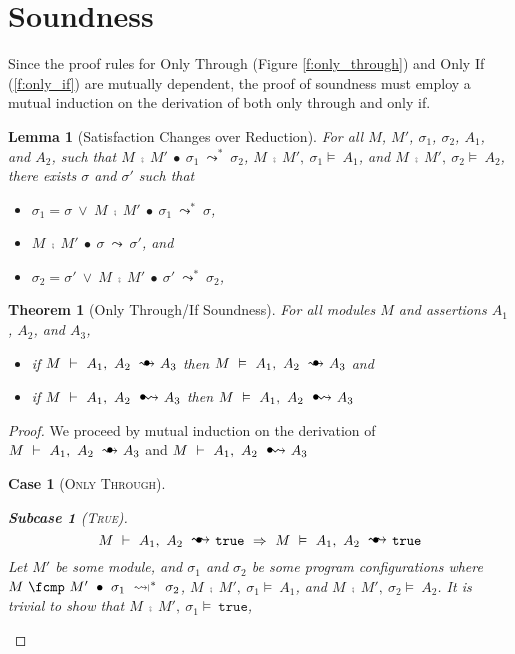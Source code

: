 \documentclass[12pt]{article}
\newcommand{\constrained}{\mathrel{\leadsto\ \!\!\!\!{\raisebox{1pt}{$\mathsmaller{\mathsmaller{\mathsmaller{\mathsmaller\rvert}}}$}}}}
\newcommand{\reduction}[4]{#1\ \fcmp\ #2\ \bullet\ #3\ \leadsto\ #4}
\newcommand{\reductions}[4]{#1\ \fcmp\ #2\ \bullet\ #3\ \leadsto^*\ #4}
\newcommand{\constrainedReductions}[4]{#1\ \fcmp\ #2\ \bullet\ #3\ \constrained^*\ #4}
\newcommand{\satisfies}[4]{#1\ \fcmp\ #2,\ #3 \vDash\ #4}
\newcommand\trans{\mathlarger{\mathlarger \leadsto}}
\newcommand\oi{\hspace{1mm}{\raisebox{1pt}{$\bullet$}}\hspace{-1mm}{\trans}}
\newcommand\ot{\hspace{2mm}{\raisebox{1pt}{$\bullet$}}\hspace{-3mm}{\trans}}
\newcommand\onlyIf[3]{#1,\ #2\ \oi\ #3}
\newcommand\onlyThrough[3]{#1,\ #2\ \ot\ #3}
\newtheorem{theorem}{Theorem}
\newtheorem{case}{Case}
\newtheorem{subcase}{Subcase}
\newtheorem{lemma}{Lemma}
\numberwithin{case}{lemma}
\numberwithin{case}{theorem}
\numberwithin{subcase}{case}
\begin{document}
\newpage
{\color{Green}
\section{Soundness}
Since the proof rules for Only Through (Figure \ref{f:only_through}) 
and Only If (\ref{f:only_if}) are mutually dependent, the proof of
soundness must employ a mutual induction on the derivation of both
only through and only if.
\begin{lemma}[Satisfaction Changes over Reduction]
\label{lem:changes_reduction}
For all $M$, $M'$, $\sigma_1$, $\sigma_2$, $A_1$, and $A_2$, such that 
$\reductions{M}{M'}{\sigma_1}{\sigma_2}$, 
$\satisfies{M}{M'}{\sigma_1}{A_1}$, and
$\satisfies{M}{M'}{\sigma_2}{A_2}$, there 
exists $\sigma$ and $\sigma'$ such that 
\begin{itemize}
\item
$\sigma_1 = \sigma\ \vee\ \reductions{M}{M'}{\sigma_1}{\sigma}$,
\item
$\reduction{M}{M'}{\sigma}{\sigma'}$, and
\item
$\sigma_2 = \sigma'\ \vee\ \reductions{M}{M'}{\sigma'}{\sigma_2}$,
\end{itemize}
\end{lemma}
\begin{theorem}[Only Through/If Soundness]
For all modules $M$ and assertions $A_1$, $A_2$, and $A_3$, 
\begin{itemize}
\item
if $M\ \vdash\ \onlyThrough{A_1}{A_2}{A_3}$ then 
$M\ \vDash\ \onlyThrough{A_1}{A_2}{A_3}$
and
\item
if $M\ \vdash\ \onlyIf{A_1}{A_2}{A_3}$ then 
$M\ \vDash\ \onlyIf{A_1}{A_2}{A_3}$
\end{itemize}
\end{theorem}
\begin{proof}
We proceed by mutual induction on the derivation of 
$M\ \vdash\ \onlyThrough{A_1}{A_2}{A_3}$ and
$M\ \vdash\ \onlyIf{A_1}{A_2}{A_3}$
\begin{case}[\textsc{Only Through}]
\begin{subcase}[\textsc{True}]
$$M\ \vdash\ \onlyThrough{A_1}{A_2}{\texttt{true}}\ \Rightarrow\ M\ \vDash\ \onlyThrough{A_1}{A_2}{\texttt{true}}$$
Let $M'$ be some module, and $\sigma_1$ and $\sigma_2$ be some program configurations where\\
$\constrainedReductions{M}{M'}{\sigma_1}{\sigma_2}$, $\satisfies{M}{M'}{\sigma_1}{A_1}$, and
$\satisfies{M}{M'}{\sigma_2}{A_2}$. It is trivial to show that $\satisfies{M}{M'}{\sigma_1}{\texttt{true}}$,

\end{subcase}
\end{case}
\end{proof}}
\end{document}
